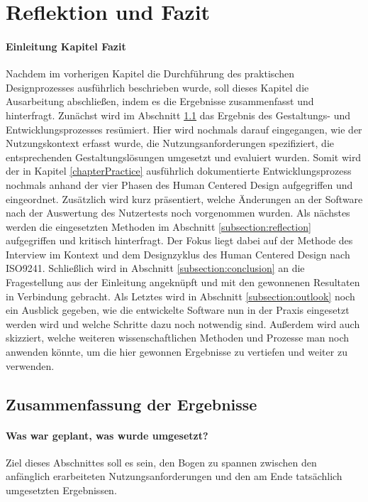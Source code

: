 \chapter{Reflektion und Fazit}
\label{chapter:conclusion}

\subsubsection{Einleitung Kapitel Fazit}

Nachdem im vorherigen Kapitel die Durchführung des praktischen Designprozesses
ausführlich beschrieben wurde, soll dieses Kapitel die Ausarbeitung
abschließen, indem es die Ergebnisse zusammenfasst und hinterfragt. Zunächst
wird im Abschnitt \ref{subsection:resultDescription} das Ergebnis des
Gestaltungs- und Entwicklungsprozesses resümiert. Hier wird nochmals darauf
eingegangen, wie der Nutzungskontext erfasst wurde, die Nutzungsanforderungen
spezifiziert, die entsprechenden Gestaltungslösungen umgesetzt und evaluiert
wurden. Somit wird der in Kapitel \ref{chapterPractice} ausführlich
dokumentierte Entwicklungsprozess nochmals anhand der vier Phasen des Human
Centered Design aufgegriffen und eingeordnet\cite{iso9241}. Zusätzlich wird
kurz präsentiert, welche Änderungen an der Software nach der Auswertung des
Nutzertests noch vorgenommen wurden. Als nächstes werden die eingesetzten
Methoden im Abschnitt \ref{subsection:reflection} aufgegriffen und kritisch
hinterfragt. Der Fokus liegt dabei auf der Methode des Interview im Kontext und
dem Designzyklus des Human Centered Design nach ISO9241. Schließlich wird in
Abschnitt \ref{subsection:conclusion} an die Fragestellung aus der Einleitung
angeknüpft und mit den gewonnenen Resultaten in Verbindung gebracht. Als
Letztes wird in Abschnitt \ref{subsection:outlook} noch ein Ausblick gegeben,
wie die entwickelte Software nun in der Praxis eingesetzt werden wird und
welche Schritte dazu noch notwendig sind. Außerdem wird auch skizziert, welche
weiteren wissenschaftlichen Methoden und Prozesse man noch anwenden könnte, um
die hier gewonnen Ergebnisse zu vertiefen und weiter zu verwenden.

\section{Zusammenfassung der Ergebnisse}
\label{subsection:resultDescription}

\subsubsection{Was war geplant, was wurde umgesetzt?}
Ziel dieses Abschnittes soll es sein, den Bogen zu spannen zwischen den
anfänglich erarbeiteten Nutzungsanforderungen und den am Ende tatsächlich
umgesetzten Ergebnissen.

